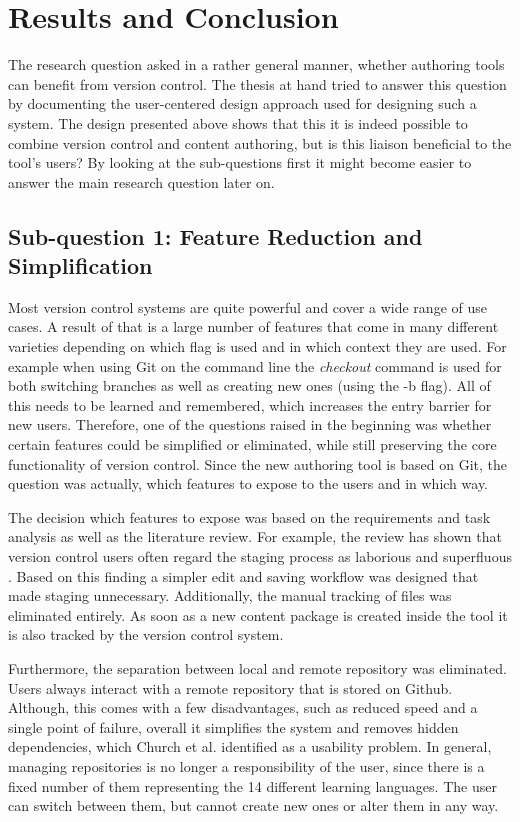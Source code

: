 \chapter{Results and Conclusion} \label{chapter:results-conclusion}
The research question asked in a rather general manner, whether authoring tools can benefit from version control. The thesis at hand tried to answer this question by documenting the user-centered design approach used for designing such a system. The design presented above shows that this it is indeed possible to combine version control and content authoring, but is this liaison beneficial to the tool's users? By looking at the sub-questions first it might become easier to answer the main research question later on.


\section{Sub-question 1: Feature Reduction and Simplification}
Most version control systems are quite powerful and cover a wide range of use cases. A result of that is a large number of features that come in many different varieties depending on which flag is used and in which context they are used. For example when using Git on the command line the \textit{checkout} command is used for both switching branches as well as creating new ones (using the -b flag). All of this needs to be learned and remembered, which increases the entry barrier for new users. Therefore, one of the questions raised in the beginning was whether certain features could be simplified or eliminated, while still preserving the core functionality of version control. Since the new authoring tool is based on Git, the question was actually, which features to expose to the users and in which way.

The decision which features to expose was based on the requirements and task analysis as well as the literature review. For example, the review has shown that version control users often regard the staging process as laborious and superfluous \cite{perez_de_rosso_whats_2013}. Based on this finding a simpler edit and saving workflow was designed that made staging unnecessary. Additionally, the manual tracking of files was eliminated entirely. As soon as a new content package is created inside the tool it is also tracked by the version control system.

Furthermore, the separation between local and remote repository was eliminated. Users always interact with a remote repository that is stored on Github. Although, this comes with a few disadvantages, such as reduced speed and a single point of failure, overall it simplifies the system and removes hidden dependencies, which Church et al. \cite{church_case_2014} identified as a usability problem. In general, managing repositories is no longer a responsibility of the user, since there is a fixed number of them representing the 14 different learning languages. The user can switch between them, but cannot create new ones or alter them in any way.

